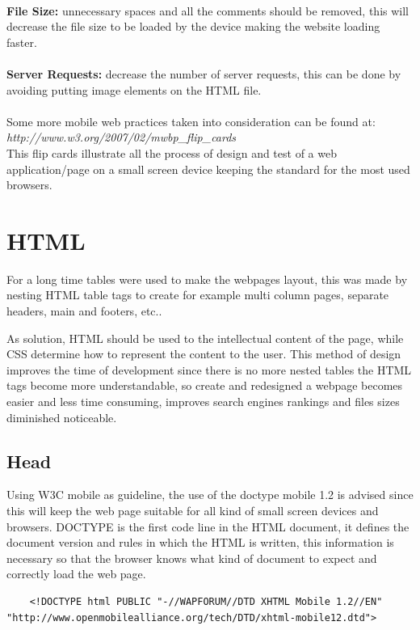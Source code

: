 \\\textbf{File Size:} unnecessary spaces and all the comments should be removed, this will decrease the file size to be loaded by the device making the website loading faster.\\
\\\textbf{Server Requests:} decrease the number of server requests, this can be done by avoiding putting image elements on the HTML file.
\\\\
Some more mobile web practices taken into consideration can be found at:
\\ \textit{http://www.w3.org/2007/02/mwbp\_flip\_cards}  \\This flip cards illustrate all the process of design and test of a web application/page on a small screen device keeping the standard for the most used browsers.

\section{HTML}

For a long time tables were used to make the webpages layout, this was made by nesting HTML table tags to create for example multi column pages, separate headers, main and footers, etc..

As solution, HTML should be used to the intellectual content of the page, while CSS determine how to represent the content to the user. This method of design improves the time of development since there is no more nested tables the HTML tags become more understandable, so create and redesigned a webpage becomes easier and less time consuming, improves search engines rankings and files sizes diminished noticeable.

\subsection{Head} 
Using W3C mobile as guideline, the use of the doctype mobile 1.2 is advised since this will keep the web page suitable for all kind of small screen devices and browsers. DOCTYPE is the first code line in the HTML document, it defines the document version and rules in which the HTML is written, this information is necessary so that the browser knows what kind of document to expect and correctly load the web page. 

\begin{lstlisting}
	<!DOCTYPE html PUBLIC "-//WAPFORUM//DTD XHTML Mobile 1.2//EN" "http://www.openmobilealliance.org/tech/DTD/xhtml-mobile12.dtd">
\end{lstlisting}

